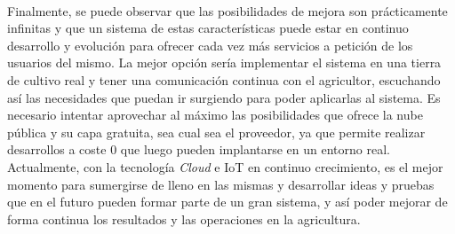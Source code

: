\documentclass[../../memoria.tex]{subfiles}
\begin{document}
\paragraph{}
Finalmente, se puede observar que las posibilidades de mejora son prácticamente infinitas y que un sistema de estas características puede estar en continuo desarrollo y evolución para ofrecer cada vez más servicios a petición de los usuarios del mismo. La mejor opción sería implementar el sistema en una tierra de cultivo real y tener una comunicación continua con el agricultor, escuchando así las necesidades que puedan ir surgiendo para poder aplicarlas al sistema. Es necesario intentar aprovechar al máximo las posibilidades que ofrece la nube pública y su capa gratuita, sea cual sea el proveedor, ya que permite realizar desarrollos a coste 0 que luego pueden implantarse en un entorno real. Actualmente, con la tecnología \textit{Cloud} e IoT en continuo crecimiento, es el mejor momento para sumergirse de lleno en las mismas y desarrollar ideas y pruebas que en el futuro pueden formar parte de un gran sistema, y así poder mejorar de forma continua los resultados y las operaciones en la agricultura.
\end{document}
